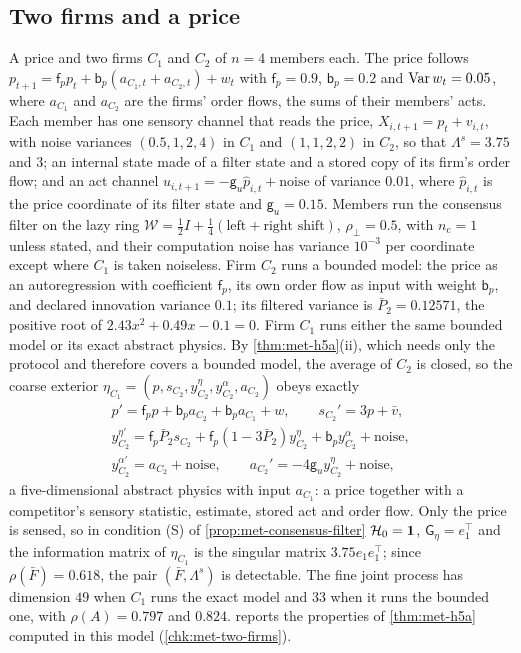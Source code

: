 \subsection{Two firms and a price}\label{sec:met-firms}

\begin{example}\label{ex:met-two-firms}
A price and two firms $C_1$ and $C_2$ of $n=4$ members each. The price follows $p_{t+1}=\mathsf f_pp_t+\mathsf b_p(a_{C_1,t}+a_{C_2,t})+w_t$ with $\mathsf f_p=0.9$, $\mathsf b_p=0.2$ and $\operatorname{Var} w_t=0.05$, where $a_{C_1}$ and $a_{C_2}$ are the firms' order flows, the sums of their members' acts. Each member has one sensory channel that reads the price, $X_{i,t+1}=p_t+v_{i,t}$, with noise variances $(0.5,1,2,4)$ in $C_1$ and $(1,1,2,2)$ in $C_2$, so that $\Lambda^s=3.75$ and $3$; an internal state made of a filter state and a stored copy of its firm's order flow; and an act channel $u_{i,t+1}=-\mathsf g_u\hat p_{i,t}+\text{noise}$ of variance $0.01$, where $\hat p_{i,t}$ is the price coordinate of its filter state and $\mathsf g_u=0.15$. Members run the consensus filter on the lazy ring $\mathcal W=\frac12I+\frac14(\text{left}+\text{right shift})$, $\rho_\perp=0.5$, with $n_{\mathrm c}=1$ unless stated, and their computation noise has variance $10^{-3}$ per coordinate except where $C_1$ is taken noiseless. Firm $C_2$ runs a bounded model: the price as an autoregression with coefficient $\mathsf f_p$, its own order flow as input with weight $\mathsf b_p$, and declared innovation variance $0.1$; its filtered variance is $\bar P_2=0.12571$, the positive root of $2.43x^2+0.49x-0.1=0$. Firm $C_1$ runs either the same bounded model or its exact abstract physics. By \cref{thm:met-h5a}(ii), which needs only the protocol and therefore covers a bounded model, the average of $C_2$ is closed, so the coarse exterior $\eta_{C_1}=(p,s_{C_2},y^\eta_{C_2},y^\alpha_{C_2},a_{C_2})$ obeys exactly
\begin{equation}\label{eq:met-firms}
\begin{gathered}
p'=\mathsf f_pp+\mathsf b_pa_{C_2}+\mathsf b_pa_{C_1}+w,\qquad s_{C_2}'=3p+\bar v,\\
y^{\eta\prime}_{C_2}=\mathsf f_p\bar P_2s_{C_2}+\mathsf f_p(1-3\bar P_2)y^\eta_{C_2}+\mathsf b_py^\alpha_{C_2}+\text{noise},\\
y^{\alpha\prime}_{C_2}=a_{C_2}+\text{noise},\qquad a_{C_2}'=-4\mathsf g_uy^\eta_{C_2}+\text{noise},
\end{gathered}
\end{equation}
a five-dimensional abstract physics with input $a_{C_1}$: a price together with a competitor's sensory statistic, estimate, stored act and order flow. Only the price is sensed, so in condition (S) of \cref{prop:met-consensus-filter} $\mathcal H_0=\mathbf{1}$, $\mathsf G_\eta=e_1^\top$ and the information matrix of $\eta_{C_1}$ is the singular matrix $3.75e_1e_1^\top$; since $\rho(\bar F)=0.618$, the pair $(\bar F,\Lambda^s)$ is detectable. The fine joint process has dimension $49$ when $C_1$ runs the exact model and $33$ when it runs the bounded one, with $\rho(A)=0.797$ and $0.824$.  reports the properties of \cref{thm:met-h5a} computed in this model (\cref{chk:met-two-firms}).
\end{example}
